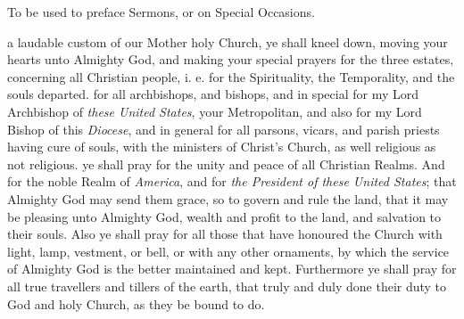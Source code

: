 \begin{rubric}
	{To be used to preface Sermons, or on Special Occasions.}
\end{rubric}
 a laudable custom of our Mother holy Church, ye shall kneel down, moving your hearts unto Almighty God, and making your special prayers for the three estates, concerning all Christian people, i. e. for the Spirituality, the Temporality, and the souls %
departed.
 for all archbishops, and bishops, and in special for my Lord Archbishop of \textit{these United States}, your Metropolitan, and also for my Lord Bishop of this \textit{Diocese}, and in general for all parsons, vicars, and parish priests having cure of souls, with the ministers of Christ's Church, as well religious as not religious.
 ye shall pray for the unity and peace of all Christian Realms. And for the noble Realm of \textit{America}, and for \textit{the President of these United States}; that Almighty God may send them grace, so to govern and rule the land, that it may be pleasing unto Almighty God, wealth and profit to the land, and salvation to their souls. Also ye shall pray for all those that have honoured the Church with light, lamp, vestment, or bell, or with any other ornaments, by which the service of Almighty God is the better maintained and kept. Furthermore ye shall pray for all true travellers and tillers of the earth, that truly and duly done their duty to God and holy Church, as they be bound to do.

